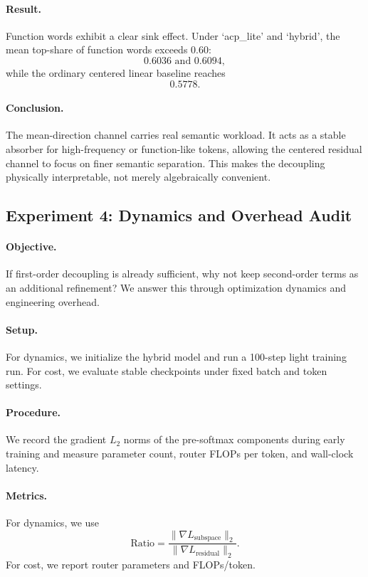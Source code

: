 \paragraph{Result.}
Function words exhibit a clear sink effect. Under `acp\_lite' and `hybrid', the mean top-share of function words exceeds $0.60$:
$$
0.6036 \text{ and } 0.6094,
$$
while the ordinary centered linear baseline reaches
$$
0.5778.
$$

\paragraph{Conclusion.}
The mean-direction channel carries real semantic workload. It acts as a stable absorber for high-frequency or function-like tokens, allowing the centered residual channel to focus on finer semantic separation. This makes the decoupling physically interpretable, not merely algebraically convenient.

\subsection{Experiment 4: Dynamics and Overhead Audit}
\paragraph{Objective.}
If first-order decoupling is already sufficient, why not keep second-order terms as an additional refinement? We answer this through optimization dynamics and engineering overhead.

\paragraph{Setup.}
For dynamics, we initialize the hybrid model and run a 100-step light training run. For cost, we evaluate stable checkpoints under fixed batch and token settings.

\paragraph{Procedure.}
We record the gradient $L_2$ norms of the pre-softmax components during early training and measure parameter count, router FLOPs per token, and wall-clock latency.

\paragraph{Metrics.}
For dynamics, we use
$$
\mathrm{Ratio}
=
\frac{\|\nabla L_{\mathrm{subspace}}\|_2}{\|\nabla L_{\mathrm{residual}}\|_2}.
$$
For cost, we report router parameters and FLOPs/token.

